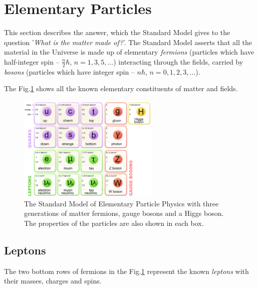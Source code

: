 \section{Elementary Particles}

This section describes the answer, which the Standard Model gives to the question '\textit{What is the matter made of?}'.
The Standard Model asserts that all the material in the Universe is made up of elementary \textit{fermions} (particles
which have half-integer spin -- $\frac{n}{2}\hbar$, $n = 1, 3, 5, ...$) interacting through the fields, carried 
by \textit{bosons} (particles which have integer spin -- $n\hbar$, $n = 0, 1, 2, 3, ...$). 

The Fig.\ref{fig:SM_Particles} shows all the known elementary constituents of matter and fields.
\begin{figure}[t]
  \centering
  \includegraphics[width=0.6\textwidth]{01_Theory_SM/plots/Standard_Model_of_Elementary_Particles.png}
  \caption{The Standard Model of Elementary Particle Physics with three generations of matter fermions, gauge bosons and a Higgs boson. 
  The properties of the particles are also shown in each box.}
  \label{fig:SM_Particles}
\end{figure}


\subsection{Leptons}

The two bottom rows of fermions in the Fig.\ref{fig:SM_Particles} represent the known \textit{leptons} with their masses, charges
and spins. 

